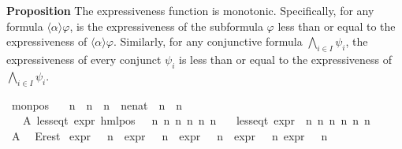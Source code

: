 \begin{isabellebody}
\begin{isamarkuptext}
\end{isamarkuptext}\isamarkuptrue%
%
\begin{isamarkuptext}%
\textbf{Proposition} The expressiveness function is monotonic. Specifically, for any formula $\langle\alpha\rangle\varphi$, is the expressiveness of the subformula $\varphi$ less than or equal to the expressiveness of $\langle\alpha\rangle\varphi$.
Similarly, for any conjunctive formula $\bigwedge_{i\in I}\psi_i$, the expressiveness of every conjunct $\psi_i$ is less than or equal to the expressiveness of $\bigwedge_{i\in I}\psi_i$.%
\end{isamarkuptext}\isamarkuptrue%
\isamarkupfalse%
\ mon{\isacharunderscore}{\kern0pt}pos{\isacharcolon}{\kern0pt}\isanewline
\ \ \ n{}\ \ n{}\ \ n{}\ \ n{}{\isacharcolon}{\kern0pt}{\isacharcolon}{\kern0pt}enat\ \ n{}\ \ n{}\ \ {\isasymalpha}\isanewline
\ \ \ A{}{\isacharcolon}{\kern0pt}\ {\isachardoublequoteopen}less{\isacharunderscore}{\kern0pt}eq{\isacharunderscore}{\kern0pt}t\ {\isacharparenleft}{\kern0pt}expr\ {\isacharparenleft}{\kern0pt}hml{\isacharunderscore}{\kern0pt}pos\ {\isasymalpha}\ {\isasymphi}{\isacharparenright}{\kern0pt}{\isacharparenright}{\kern0pt}\ {\isacharparenleft}{\kern0pt}n{}{\isacharcomma}{\kern0pt}\ n{}{\isacharcomma}{\kern0pt}\ n{}{\isacharcomma}{\kern0pt}\ n{}{\isacharcomma}{\kern0pt}\ n{}{\isacharcomma}{\kern0pt}\ n{}{\isacharparenright}{\kern0pt}{\isachardoublequoteclose}\isanewline
\ \ \ {\isachardoublequoteopen}less{\isacharunderscore}{\kern0pt}eq{\isacharunderscore}{\kern0pt}t\ {\isacharparenleft}{\kern0pt}expr\ {\isasymphi}{\isacharparenright}{\kern0pt}\ {\isacharparenleft}{\kern0pt}n{}{\isacharcomma}{\kern0pt}\ n{}{\isacharcomma}{\kern0pt}\ n{}{\isacharcomma}{\kern0pt}\ n{}{\isacharcomma}{\kern0pt}\ n{}{\isacharcomma}{\kern0pt}\ n{}{\isacharparenright}{\kern0pt}{\isachardoublequoteclose}\ \isanewline
%
\isadelimproof
%
\endisadelimproof
%
\isatagproof
{}\isamarkupfalse%
{\isacharminus}{\kern0pt}\isanewline
\ \ \isamarkupfalse%
\ A{}\ \isamarkupfalse%
\ E{\isacharunderscore}{\kern0pt}rest{\isacharcolon}{\kern0pt}\ \isanewline
{\isachardoublequoteopen}expr{\isacharunderscore}{\kern0pt}{}\ {\isasymphi}\ {\isasymle}\ n{}\ {\isasymand}\ expr{\isacharunderscore}{\kern0pt}{}\ {\isasymphi}\ {\isasymle}\ n{}\ {\isasymand}\ expr{\isacharunderscore}{\kern0pt}{}\ {\isasymphi}\ {\isasymle}\ n{}\ {\isasymand}\ expr{\isacharunderscore}{\kern0pt}{}\ {\isasymphi}\ {\isasymle}\ n{}\ {\isasymand}expr{\isacharunderscore}{\kern0pt}{}\ {\isasymphi}\ {\isasymle}\ n{}{\isachardoublequoteclose}\ \isanewline

\end{isabellebody}
